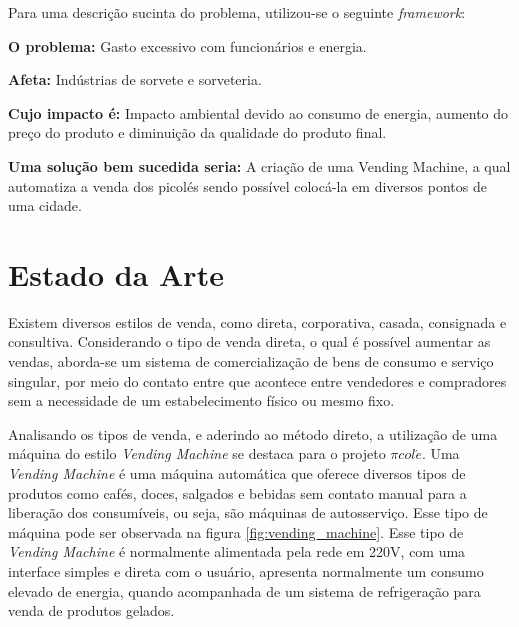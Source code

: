 Para uma descrição sucinta do problema, utilizou-se o seguinte \textit{framework}:

\textbf{O problema:} Gasto excessivo com funcionários e energia.

\textbf{Afeta:} Indústrias de sorvete e sorveteria.

\textbf{Cujo impacto é:} Impacto ambiental devido ao consumo de energia, aumento do preço do produto e diminuição da qualidade do produto final.

\textbf{Uma solução bem sucedida seria:} A criação de uma Vending Machine, a qual automatiza a venda dos picolés sendo possível colocá-la em diversos pontos de uma cidade.

\section{Estado da Arte}

Existem diversos estilos de venda, como direta, corporativa, casada, consignada e consultiva. Considerando o tipo de venda direta, o qual é possível aumentar as vendas, aborda-se um sistema de comercialização de bens de consumo e serviço singular, por meio do contato entre que acontece entre vendedores e compradores sem a necessidade de um estabelecimento físico ou mesmo fixo. \cite {MARQUES} 

	Analisando os tipos de venda, e aderindo ao método direto, a utilização de uma máquina do estilo \textit{Vending Machine} se destaca para o projeto $\pi col\acute{e}$. Uma \textit{Vending Machine} é uma máquina automática que oferece diversos tipos de produtos como cafés, doces, salgados e bebidas sem contato manual para a liberação dos consumíveis, ou seja, são máquinas de autosserviço. Esse tipo de máquina pode ser observada na figura \ref{fig:vending_machine}.
	Esse tipo de \textit{Vending Machine} é normalmente alimentada pela rede em 220V, com uma interface simples e direta com o usuário, apresenta normalmente um consumo elevado de energia, quando acompanhada de um sistema de refrigeração para venda de produtos gelados.

